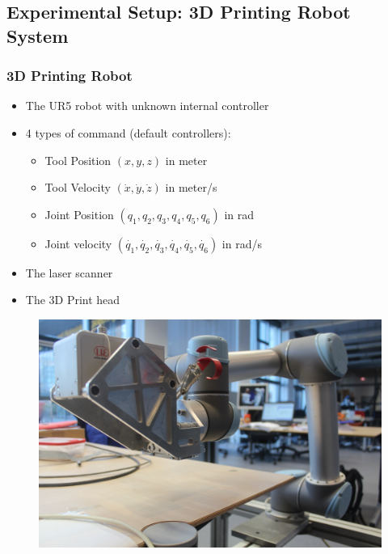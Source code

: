 \documentclass{beamer}
\begin{document}
	\subsection{Experimental Setup: 3D Printing Robot System}
	\begin{frame}\frametitle{3D Printing Robot}
		\vspace{2mm}
		\fontsize{9}{4}\selectfont 
		\begin{itemize}
			\item The UR5 robot with unknown internal controller \pause
			\item 4 types of command (default controllers): \pause
			\begin{itemize} \fontsize{8}{4}\selectfont  
				\item Tool Position $ (x, y, z) $ in meter \vspace{0.5mm} 
				\item Tool Velocity $ (\dot{x}, \dot{y}, \dot{z}) $ in meter/s \vspace{0.5mm}
				\item Joint Position $ (q_1, q_2, q_3 , q_4, q_5, q_6)$ in rad \vspace{0.5mm}
				\item Joint velocity $ (\dot{q_1}, \dot{q_2}, \dot{q_3} , \dot{q_4}, \dot{q_5}, \dot{q_6})$ in rad/s
			\end{itemize} \vspace{1mm} 
			\pause
			\item The laser scanner \vspace{1mm} \pause
			\item The 3D Print head					
		\end{itemize}
		\pause
		\begin{figure}
		\centering
		\includegraphics[width=0.53\linewidth]{images/IMG_9011}
		\caption{}
		\label{fig:IMG_9011}
		\end{figure}
	\end{frame}
\end{document}
